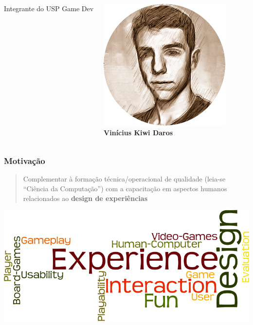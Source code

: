 \expandafter\documentclass\expandafter[table, usenames, svgnames, dvipsnames, \classopts]{beamer}
\begin{document}
\begin{frame}
\begin{columns}[c]
\begin{outline}
				\1 Integrante do USP Game Dev
			\end{outline}
		
		
			\begin{center}
				\includegraphics[height=0.2\paperheight]{vinicius}\\
				\textbf{Vinícius Kiwi Daros}
			\end{center}
		
	\end{columns}	

\end{frame}

\begin{frame}
	\frametitle{\textbf{Motivação}}
	
	\begin{block}{}
	
		\vspace{1em}
	
		\begin{quotation}
			\noindent
			\justify
			{\large Complementar à formação técnica/operacional de qualidade (leia-se ``Ciência da Computação'') com a capacitação em aspectos humanos relacionados ao \textbf{design de experiências}}
		\end{quotation}

		\vspace{1em}

	\end{block}
	
	\begin{center}
		\includegraphics[height=0.4\paperheight]{word-cloud}\\
	\end{center}

\end{frame}
\end{document}
